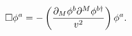 \begin{equation}
    \Box \phi^a = - \left({\partial_M\phi^b
\partial^M\phi^{b\dagger}\over v^2}\right) \phi^a.
    \label{eomphi2}
\end{equation}

